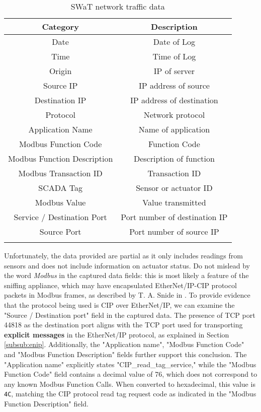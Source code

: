 {\small
\begin{longtable}[c]{| c | c |}
	\hline
	\textbf{Category} & \textbf{Description} \\ [0.5ex] 
	\hline
	Date & Date of Log \\
	\hline 
	Time & Time of Log \\
	\hline
	Origin & IP of server \\
	\hline 
	Source IP & IP address of source \\ 
	\hline
	Destination IP & IP address of destination \\ 
	\hline
	Protocol & Network protocol \\ 
	\hline
	Application Name & Name of application \\ 
	\hline
	Modbus Function Code & Function Code \\ 
	\hline
	Modbus Function Description & Description of function \\ 
	\hline
	Modbus Transaction ID & Transaction ID \\ 
	\hline
	SCADA Tag & Sensor or actuator ID \\ 
	\hline
	Modbus Value & Value transmitted \\ 
	\hline
	Service / Destination Port & Port number of destination IP \\ 
	\hline
	Source Port & Port number of source IP \\ 
	\hline
	
	\caption{SWaT network traffic data}
	\label{table:5_swat_network_traffic_data}
\end{longtable} }
Unfortunately, the data provided are partial as it only includes readings from sensors and does not include information on actuator status.\newline \newline
Do not mislead by the word \textit{Modbus} in the captured data fields: this is most likely a feature of the sniffing appliance, which may have encapsulated EtherNet/IP-CIP protocol packets in Modbus frames, as described by T. A. Snide in \cite{cip_in_modbus}.\newline
To provide evidence that the protocol being used is CIP over EtherNet/IP, we can examine the "Source / Destination port" field in the captured data. The presence of TCP port 44818 as the destination port aligns with the TCP port used for transporting \textbf{explicit messages} in the EtherNet/IP protocol, as explained in Section \ref{subsub:enip}. Additionally, the "Application name", "Modbus Function Code" and "Modbus Function Description" fields further support this conclusion. The "Application name" explicitly states "CIP\_read\_tag\_service," while the "Modbus Function Code" field contains a decimal value of 76, which does not correspond to any known Modbus Function Calls. When converted to hexadecimal, this value is \texttt{4C}, matching the CIP protocol read tag request code as indicated in the "Modbus Function Description" field.

